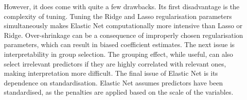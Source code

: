 However, it does come with quite a few drawbacks. Its first disadvantage is the complexity of tuning. Tuning the Ridge and Lasso regularisation parameters simultaneously makes Elastic Net computationally more intensive than Lasso or Ridge.\cite{elasticnet} Over-shrinkage can be a consequence of improperly chosen regularisation parameters, which can result in biased coefficient estimates.\cite{elasticnet} The next issue is
interpretability in group selection. The grouping effect, while useful, can also select irrelevant predictors if they are highly correlated with relevant ones, making interpretation more difficult.\cite{elasticnet} The final issue of Elastic Net is its dependence on standardisation. Elastic Net assumes predictors have been standardised, as the penalties are applied based on the scale of the variables.\cite{elasticnet}

